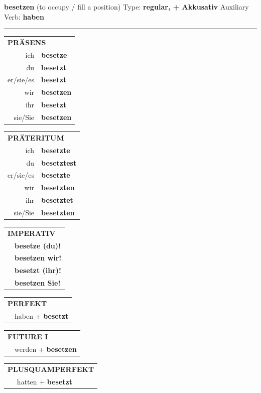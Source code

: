 \documentclass[10pt,a4paper]{revtex4-2}
\begin{document}
\begin{verbbox-acc}
{\Large \bf besetzen} (to occupy / fill a position) \hfill Type: \textbf{regular, + Akkusativ} \hfill Auxiliary Verb: \textbf{haben}

\vspace{5pt}
\hrule
\vspace{5pt}

\begin{tabular}{rl}
\multicolumn{2}{l}{\textbf{PRÄSENS}}\\
ich & \textbf{besetze}\\
du & \textbf{besetzt}\\
er/sie/es & \textbf{besetzt}\\
wir & \textbf{besetzen}\\
ihr & \textbf{besetzt}\\
sie/Sie & \textbf{besetzen}\\
\end{tabular}
\hfill
\begin{tabular}{rl}
\multicolumn{2}{l}{\textbf{PRÄTERITUM}}\\
ich & \textbf{besetzte}\\
du & \textbf{besetztest}\\
er/sie/es & \textbf{besetzte}\\
wir & \textbf{besetzten}\\
ihr & \textbf{besetztet}\\
sie/Sie & \textbf{besetzten}\\
\end{tabular}
\hfill
\begin{tabular}{rl}
\multicolumn{2}{l}{\textbf{IMPERATIV}}\\
& \textbf{besetze (du)!}\\
& \textbf{besetzen wir!}\\
& \textbf{besetzt (ihr)!}\\
& \textbf{besetzen Sie!}\\
\end{tabular}

\vspace{10pt}

\begin{tabular}{rl}
\multicolumn{2}{l}{\textbf{PERFEKT}}\\
& haben + \textbf{besetzt}\\
\end{tabular}
\hfill
\begin{tabular}{rl}
\multicolumn{2}{l}{\textbf{FUTURE I}}\\
& werden + \textbf{besetzen}\\
\end{tabular}
\hfill
\begin{tabular}{rl}
\multicolumn{2}{l}{\textbf{PLUSQUAMPERFEKT}}\\
& hatten + \textbf{besetzt}\\
\end{tabular}


\end{verbbox-acc}
\end{document}
